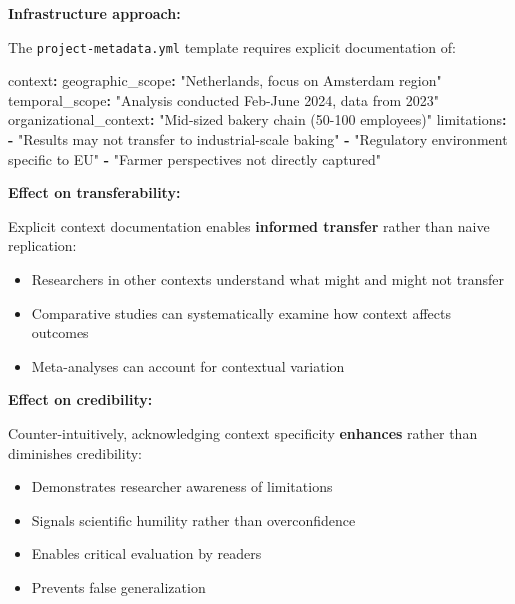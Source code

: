 \documentclass[
  oneside,
  open=any]{scrbook}
\newenvironment{Shaded}{\begin{snugshade}}{\end{snugshade}}
\newcommand{\AttributeTok}[1]{\textcolor[rgb]{0.40,0.45,0.13}{#1}}
\newcommand{\FunctionTok}[1]{\textcolor[rgb]{0.28,0.35,0.67}{#1}}
\newcommand{\KeywordTok}[1]{\textcolor[rgb]{0.00,0.23,0.31}{\textbf{#1}}}
\newcommand{\StringTok}[1]{\textcolor[rgb]{0.13,0.47,0.30}{#1}}
\providecommand{\tightlist}{%
  \setlength{\itemsep}{0pt}\setlength{\parskip}{0pt}}\usepackage{longtable,booktabs,array}
\begin{document}
\textbf{Infrastructure approach:}

The \texttt{project-metadata.yml} template requires explicit
documentation of:

\begin{Shaded}
\begin{Highlighting}[]
\FunctionTok{context}\KeywordTok{:}
\AttributeTok{  }\FunctionTok{geographic\_scope}\KeywordTok{:}\AttributeTok{ }\StringTok{"Netherlands, focus on Amsterdam region"}
\AttributeTok{  }\FunctionTok{temporal\_scope}\KeywordTok{:}\AttributeTok{ }\StringTok{"Analysis conducted Feb{-}June 2024, data from 2023"}
\AttributeTok{  }\FunctionTok{organizational\_context}\KeywordTok{:}\AttributeTok{ }\StringTok{"Mid{-}sized bakery chain (50{-}100 employees)"}
\AttributeTok{  }\FunctionTok{limitations}\KeywordTok{:}
\AttributeTok{    }\KeywordTok{{-}}\AttributeTok{ }\StringTok{"Results may not transfer to industrial{-}scale baking"}
\AttributeTok{    }\KeywordTok{{-}}\AttributeTok{ }\StringTok{"Regulatory environment specific to EU"}
\AttributeTok{    }\KeywordTok{{-}}\AttributeTok{ }\StringTok{"Farmer perspectives not directly captured"}
\end{Highlighting}
\end{Shaded}

\textbf{Effect on transferability:}

Explicit context documentation enables \textbf{informed transfer} rather
than naive replication:

\begin{itemize}
\tightlist
\item
  Researchers in other contexts understand what might and might not
  transfer
\item
  Comparative studies can systematically examine how context affects
  outcomes
\item
  Meta-analyses can account for contextual variation
\end{itemize}

\textbf{Effect on credibility:}

Counter-intuitively, acknowledging context specificity \textbf{enhances}
rather than diminishes credibility:

\begin{itemize}
\tightlist
\item
  Demonstrates researcher awareness of limitations
\item
  Signals scientific humility rather than overconfidence
\item
  Enables critical evaluation by readers
\item
  Prevents false generalization
\end{itemize}
\end{document}

